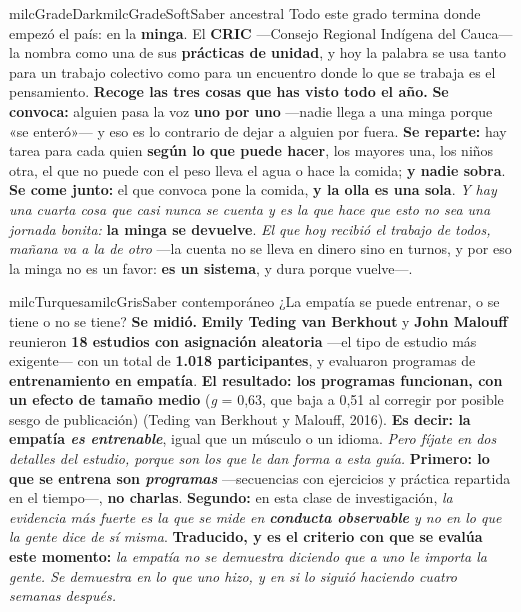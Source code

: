 \documentclass[11pt,letterpaper]{article}
\begin{document}
\begin{softbox}{milcGradeDark}{milcGradeSoft}{Saber ancestral}
Todo este grado termina donde empezó el país: en la \textbf{minga}. El \textbf{CRIC} ---Consejo Regional Indígena del Cauca--- la nombra como una de sus \textbf{prácticas de unidad}, y hoy la palabra se usa tanto para un trabajo colectivo como para un encuentro donde lo que se trabaja es el pensamiento. \textbf{Recoge las tres cosas que has visto todo el año.} \textbf{Se convoca:} alguien pasa la voz \textbf{uno por uno} ---nadie llega a una minga porque «se enteró»--- y eso es lo contrario de dejar a alguien por fuera. \textbf{Se reparte:} hay tarea para cada quien \textbf{según lo que puede hacer}, los mayores una, los niños otra, el que no puede con el peso lleva el agua o hace la comida; \textbf{y nadie sobra}. \textbf{Se come junto:} el que convoca pone la comida, \textbf{y la olla es una sola}. \emph{Y hay una cuarta cosa que casi nunca se cuenta y es la que hace que esto no sea una jornada bonita:} \textbf{la minga se devuelve}. \emph{El que hoy recibió el trabajo de todos, mañana va a la de otro} ---la cuenta no se lleva en dinero sino en turnos, y por eso la minga no es un favor: \textbf{es un sistema}, y dura porque vuelve---.
\end{softbox}

\begin{softbox}{milcTurquesa}{milcGris}{Saber contemporáneo}
¿La empatía se puede entrenar, o se tiene o no se tiene? \textbf{Se midió.} \textbf{Emily Teding van Berkhout} y \textbf{John Malouff} reunieron \textbf{18 estudios con asignación aleatoria} ---el tipo de estudio más exigente--- con un total de \textbf{1.018 participantes}, y evaluaron programas de \textbf{entrenamiento en empatía}. \textbf{El resultado: los programas funcionan, con un efecto de tamaño medio} (\emph{g} = 0,63, que baja a 0,51 al corregir por posible sesgo de publicación) (Teding van Berkhout y Malouff, 2016). \textbf{Es decir: la empatía \emph{es entrenable}}, igual que un músculo o un idioma. \emph{Pero fíjate en dos detalles del estudio, porque son los que le dan forma a esta guía.} \textbf{Primero: lo que se entrena son \emph{programas}} ---secuencias con ejercicios y práctica repartida en el tiempo---, \textbf{no charlas}. \textbf{Segundo:} en esta clase de investigación, \emph{la evidencia más fuerte es la que se mide en \textbf{conducta observable} y no en lo que la gente dice de sí misma}. \textbf{Traducido, y es el criterio con que se evalúa este momento:} \emph{la empatía no se demuestra diciendo que a uno le importa la gente. Se demuestra en lo que uno hizo, y en si lo siguió haciendo cuatro semanas después.}
\end{softbox}
\end{document}
